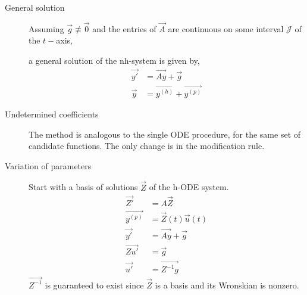 \begin{description}
    \item[General solution] Assuming $ \vec{g} \not \equiv \vec{0}$ and the entries of
        $ \vec{A} $ are continuous on some interval $ \mathcal{J} $ of the $t-$axis,\par
        a general solution of the nh-system is given by,
        \begin{align}
            \vec{y'} & = \vec{Ay} + \vec{g}            \\
            \vec{y}  & = \vec{y^{(h)}} + \vec{y^{(p)}}
        \end{align}
    \item[Undetermined coefficients] The method is analogous to the single ODE
        procedure, for the same set of candidate functions. The only change is in the
        modification rule.
    \item[Variation of parameters] Start with a basis of solutions $ \vec{Z} $ of the
        h-ODE system.
        \begin{align}
            \vec{Z'}      & = A\vec{Z}                      \\
            \vec{y^{(p)}} & = \vec{Z}(t)\vec{u}(t)          \\
            \vec{y'}      & = \vec{Ay} + \vec{g}  \nonumber \\
            \vec{Zu'}     & = \vec{g}                       \\
            \vec{u'}      & = \vec{Z^{-1}g}
        \end{align}
        $ \vec{Z^{-1}} $ is guaranteed to exist since $ \vec{Z} $ is a basis and
        its Wronskian is nonzero.
\end{description}